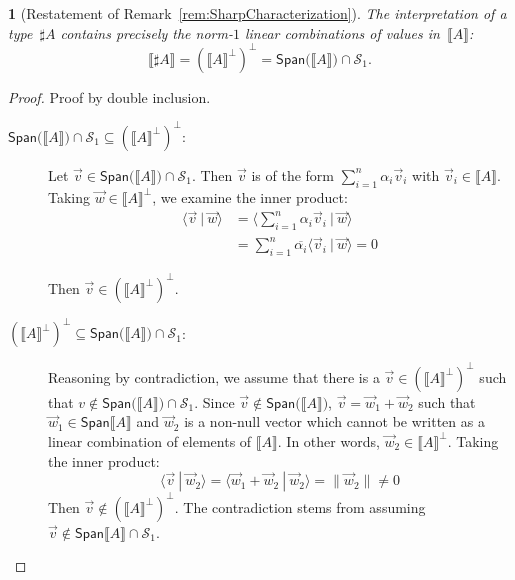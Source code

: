 \documentclass[a4paper,UKenglish,numberwithinsect,pdfa,anonymous]{lipics-v2021}
\theoremstyle{restatestyle}
\newtheorem*{restatetheorem}{}
\newcommand\Span[1]{\ensuremath{{\mathsf{Span}}{#1}}}
\def\Sph{\mathcal{S}_1}       %
\def\scal#1#2{\langle{#1}~|~{#2}\rangle}
\def\sem#1{\llbracket#1\rrbracket}
\begin{document}
\begin{restatetheorem}[Restatement of Remark~\ref{rem:SharpCharacterization}]
  \itshape
  The interpretation of a type~$\sharp A$ contains precisely the
  norm-$1$ linear combinations of values in~$\sem{A}$:
  \[
    \sem{\sharp A}
    = (\sem{A}^\bot)^\bot
    = \Span(\sem{A}) \cap \Sph.
  \]
\end{restatetheorem}
\begin{proof}
  Proof by double inclusion.
  \begin{description}
    \item[$\Span(\sem{A})\cap\Sph\subseteq (\sem{A}^\bot)^\bot$:] Let $\vec{v}\in\Span(\sem{A})\cap\Sph$. Then $\vec{v}$ is of the form $\sum_{i=1}^{n}\alpha_i \vec{v}_{i}$ with $\vec{v}_{i}\in\sem{A}$. Taking $\vec{w}\in\sem{A}^\bot$, we examine the inner product:
    \begin{align*}
    \scal{\vec{v}}{\vec{w}} &= \scal{\sum_{i=1}^{n}\alpha_i \vec{v}_{i}}{\vec{w}}\\
    &= \sum_{i=1}^{n}\overline{\alpha_i}\scal{\vec{v}_{i}}{\vec{w}}=0
    \end{align*}

    Then $\vec{v}\in(\sem{A}^\bot)^\bot$.

    \item[$(\sem{A}^\bot)^\bot\subseteq \Span(\sem{A})\cap\Sph$:] Reasoning by contradiction, we assume that there is a $\vec{v}\in(\sem{A}^\bot)^\bot$ such that $v\not\in\Span(\sem{A})\cap\Sph$. Since $\vec{v}\not\in\Span(\sem{A})$, $\vec{v}=\vec{w}_{1} + \vec{w}_{2}$ such that $\vec{w}_{1}\in\Span{\sem{A}}$ and $\vec{w}_{2}$ is a non-null vector which cannot be written as a linear combination of elements of $\sem{A}$. In other words, $\vec{w}_{2}\in\sem{A}^\bot$. Taking the inner product:
    \[
    \scal{\vec{v}}{\vec{w}_{2}} = \scal{\vec{w}_{1}+\vec{w}_{2}}{\vec{w}_{2}} = \|\vec{w}_{2}\|\neq 0
    \]
    Then $\vec{v}\not\in(\sem{A}^\bot)^\bot$. The contradiction stems from assuming $\vec{v}\not\in\Span{\sem{A}}\cap\Sph$.\qedhere
  \end{description}
\end{proof}
\end{document}
